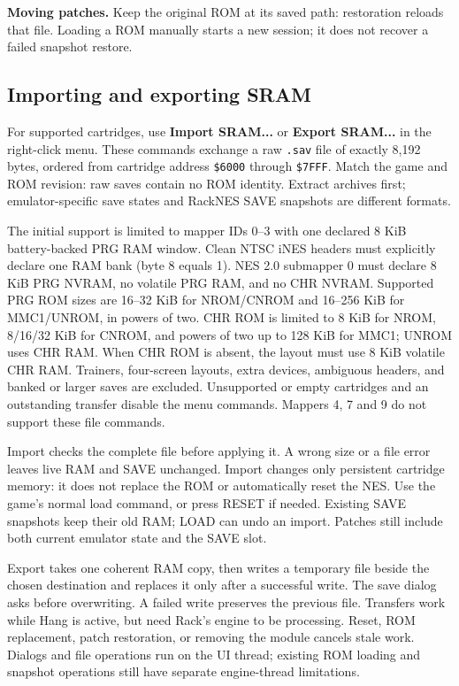 \textbf{Moving patches.} Keep the original ROM at its saved path: restoration
reloads that file. Loading a ROM manually starts a new session; it does not
recover a failed snapshot restore.
\newpage
\subsection{Importing and exporting SRAM}\label{sec:sram}
For supported cartridges, use \textbf{Import SRAM...} or
\textbf{Export SRAM...} in the right-click menu. These commands exchange a
raw \texttt{.sav} file of exactly 8,192 bytes, ordered from cartridge address
\texttt{\$6000} through \texttt{\$7FFF}. Match the game and ROM revision:
raw saves contain no ROM identity. Extract archives first; emulator-specific
save states and RackNES SAVE snapshots are different formats.

The initial support is limited to mapper IDs 0--3 with one declared 8 KiB
battery-backed PRG RAM window. Clean NTSC iNES headers must explicitly declare
one RAM bank (byte 8 equals 1). NES 2.0 submapper 0 must declare 8 KiB PRG
NVRAM, no volatile PRG RAM, and no CHR NVRAM. Supported PRG ROM sizes are
16--32 KiB for NROM/CNROM and 16--256 KiB for MMC1/UNROM, in powers of two.
CHR ROM is limited to 8 KiB for NROM, 8/16/32 KiB for CNROM, and powers of two
up to 128 KiB for MMC1; UNROM uses CHR RAM. When CHR ROM is absent, the layout
must use 8 KiB volatile CHR RAM. Trainers, four-screen layouts, extra devices,
ambiguous headers, and banked or larger saves are excluded. Unsupported or
empty cartridges and an outstanding transfer disable the menu commands.
Mappers 4, 7 and 9 do not support these file commands.

Import checks the complete file before applying it. A wrong size or a file
error leaves live RAM and SAVE unchanged. Import changes only persistent
cartridge memory: it does not replace the ROM or automatically reset the NES.
Use the game's normal load command, or press RESET if needed. Existing SAVE
snapshots keep their old RAM; LOAD can undo an import. Patches still include
both current emulator state and the SAVE slot.

Export takes one coherent RAM copy, then writes a temporary file beside the
chosen destination and replaces it only after a successful write. The save
dialog asks before overwriting. A failed write preserves the previous file.
Transfers work while Hang is active, but need Rack's engine to be processing.
Reset, ROM replacement, patch restoration, or removing the module cancels
stale work. Dialogs and file operations run on the UI thread; existing ROM
loading and snapshot operations still have separate engine-thread limitations.
